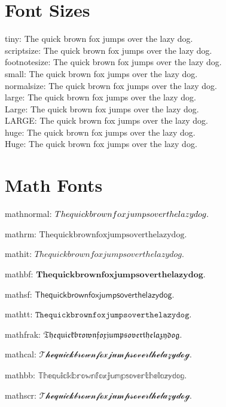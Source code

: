 \documentclass{article}
\newcommand{\fontsizephrase}{The quick brown fox jumps over the lazy dog.}
\newcommand{\fontsizetest}{
  tiny: {\tiny \fontsizephrase}\\
  scriptsize: {\scriptsize \fontsizephrase}\\
  footnotesize: {\footnotesize \fontsizephrase}\\
  small: {\small \fontsizephrase}\\
  normalsize: {\normalsize \fontsizephrase}\\
  large: {\large \fontsizephrase}\\
  Large: {\Large \fontsizephrase}\\
  LARGE: {\LARGE \fontsizephrase}\\
  huge: {\huge \fontsizephrase}\\
  Huge: {\Huge \fontsizephrase}\\
}
\begin{document}
\section{Font Sizes}

\fontsizetest

\section{Math Fonts}

mathnormal: $\mathnormal{\fontsizephrase}$

mathrm: $\mathrm{\fontsizephrase}$

mathit: $\mathit{\fontsizephrase}$

mathbf: $\mathbf{\fontsizephrase}$

mathsf: $\mathsf{\fontsizephrase}$

mathtt: $\mathtt{\fontsizephrase}$

mathfrak: $\mathfrak{\fontsizephrase}$

mathcal: $\mathcal{\fontsizephrase}$

mathbb: $\mathbb{\fontsizephrase}$

mathscr: $\mathscr{\fontsizephrase}$
\end{document}

